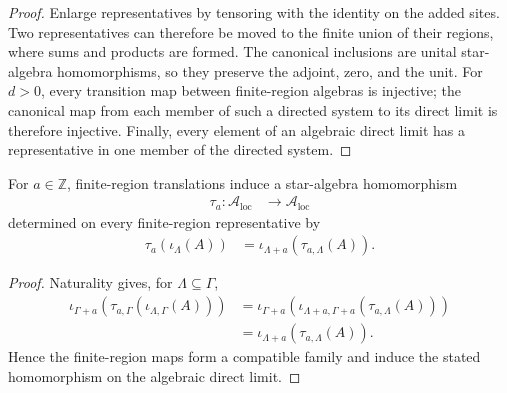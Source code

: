 \begin{proof}\leanok
    Enlarge representatives by tensoring with the identity on the added sites.
    Two representatives can therefore be moved to the finite union of their
    regions, where sums and products are formed.  The canonical inclusions are
    unital star-algebra homomorphisms, so they preserve the adjoint, zero, and
    the unit.  For $d>0$, every transition map between finite-region algebras is
    injective; the canonical map from each member of such a directed system to
    its direct limit is therefore injective.  Finally, every element of an
    algebraic direct limit has a representative in one member of the directed
    system.
\end{proof}

\begin{definition}
    \label{def:qca_algebraic_local_translation_hom}
    \leanok
    For $a\in\mathbb Z$, finite-region translations induce a star-algebra
    homomorphism
    \begin{align}
        \tau_a\colon\mathcal A_{\mathrm{loc}} & \longrightarrow
        \mathcal A_{\mathrm{loc}}
    \end{align}
    determined on every finite-region representative by
    \begin{align}
        \tau_a(\iota_\Lambda(A))
         & =\iota_{\Lambda+a}(\tau_{a,\Lambda}(A)).
    \end{align}
\end{definition}

\begin{proof}\leanok
    Naturality gives, for $\Lambda\subseteq\Gamma$,
    \begin{align}
        \iota_{\Gamma+a}\!\left(\tau_{a,\Gamma}(\iota_{\Lambda,\Gamma}(A))\right)
         & =\iota_{\Gamma+a}\!\left(\iota_{\Lambda+a,\Gamma+a}(\tau_{a,\Lambda}(A))\right) \\
         & =\iota_{\Lambda+a}(\tau_{a,\Lambda}(A)).
    \end{align}
    Hence the finite-region maps form a compatible family and induce the stated
    homomorphism on the algebraic direct limit.
\end{proof}

